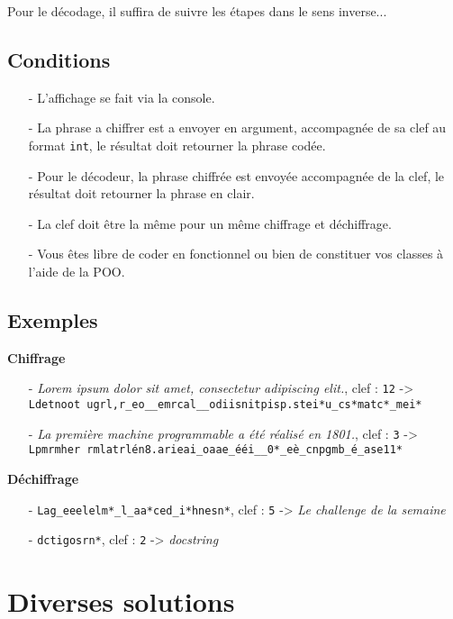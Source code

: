 Pour le décodage, il suffira de suivre les étapes dans le sens inverse...
\medskip

\subsection*{Conditions}
\begin{itemize}
	\item[-] L'affichage se fait via la console.
	\item[-] La phrase a chiffrer est a envoyer en argument, accompagnée de sa clef au format \texttt{int}, le résultat doit retourner la phrase codée.
	\item[-] Pour le décodeur, la phrase chiffrée est envoyée accompagnée de la clef, le résultat doit retourner la phrase en clair.
	\item[-] La clef doit être la même pour un même chiffrage et déchiffrage.
	\item[-] Vous êtes libre de coder en fonctionnel ou bien de constituer vos classes à l'aide de la POO.
\end{itemize}
\medskip

\subsection*{Exemples}
\textbf{\textbullet{} Chiffrage}
\begin{itemize}
	\item[-] \og \textit{Lorem ipsum dolor sit amet, consectetur adipiscing elit.}\fg{}, clef : \texttt{12} -> \texttt{Ldetnoot
	ugrl,r\_eo\_\_emrcal\_\_odiisnitpisp.stei*u\_cs*matc*\_mei*}
	\item[-] \og \textit{La première machine programmable a été réalisé en 1801.}\fg{}, clef : \texttt{3} -> \texttt{Lpmrmher
	rmlatrlén8.arieai\_oaae\_ééi\_\_0*\_eè\_cnpgmb\_é\_ase11*}
\end{itemize}
\medskip

\textbf{\textbullet{} Déchiffrage}
\begin{itemize}
	\item[-] \texttt{Lag\_eeelelm*\_l\_aa*ced\_i*hnesn*}, clef : \texttt{5} -> \og \textit{Le challenge de la semaine}\fg{}
	\item[-] \texttt{dctigosrn*}, clef : \texttt{2} -> \og \textit{docstring}\fg{}
\end{itemize}
\medskip

\section{Diverses solutions}
